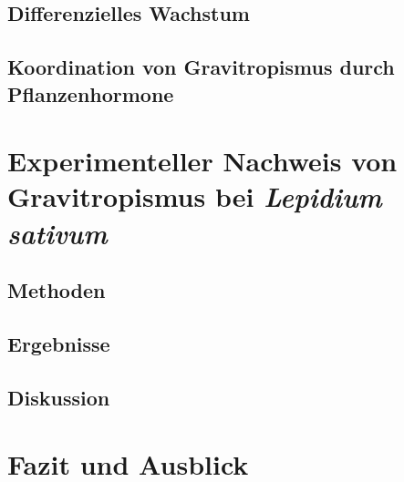 \documentclass[
a4paper, 
11pt, 
ngerman,
listof=totoc,
bibliography=totocnumbered
]{scrreprt}
\begin{document}
\section{Differenzielles Wachstum}

\section{Koordination von Gravitropismus durch Pflanzenhormone}

\chapter{Experimenteller Nachweis von Gravitropismus bei \emph{Lepidium sativum}}

\section{Methoden}

\section{Ergebnisse}

\section{Diskussion}

\chapter{Fazit und Ausblick}


\printbibliography
\end{document}
